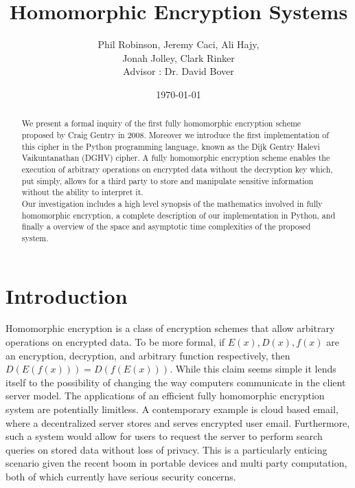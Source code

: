 \documentclass[letterpaper,11pt]{article} %
\title{Homomorphic Encryption Systems}
\date{\today}
\author{
Phil Robinson, Jeremy Caci, Ali Hajy,\\
Jonah Jolley, Clark Rinker\\
Advisor : Dr. David Bover}
\begin{document}
\maketitle

\begin{abstract}
\hspace{1em}We present a formal inquiry of the first fully homomorphic encryption scheme proposed by Craig Gentry in 2008. Moreover we introduce the first implementation of this cipher in the Python programming language, known as the Dijk Gentry Halevi Vaikuntanathan (DGHV) cipher. A fully homomorphic encryption scheme enables the execution of arbitrary operations on encrypted data without the decryption key which, put simply, allows for a third party to  store and manipulate sensitive information without the ability to interpret it.\\ 

\hspace{1em}Our investigation includes a high level synopsis of the mathematics involved in fully homomorphic encryption, a complete description of our implementation in Python, and finally a overview of the space and asymptotic time complexities of the proposed system. 
\end{abstract}


\section*{Introduction}

	Homomorphic encryption is a class of encryption schemes that allow arbitrary operations on encrypted data. To be more formal, if $E(x),D(x),f(x)$ are an encryption, decryption, and arbitrary function respectively, then $D(E(f(x)))=D(f(E(x)))$. While this claim seems simple it lends itself to the possibility of changing the way computers communicate in the client server model. The applications of an efficient fully homomorphic encryption system are potentially limitless. A contemporary example is cloud based email, where a decentralized server stores and serves encrypted user email. Furthermore, such a system would allow for users to request the server to perform search queries on stored data without loss of privacy. This is a particularly enticing scenario given the recent boom in portable devices and multi party computation, both of which currently have serious security concerns. \\
\end{document}
